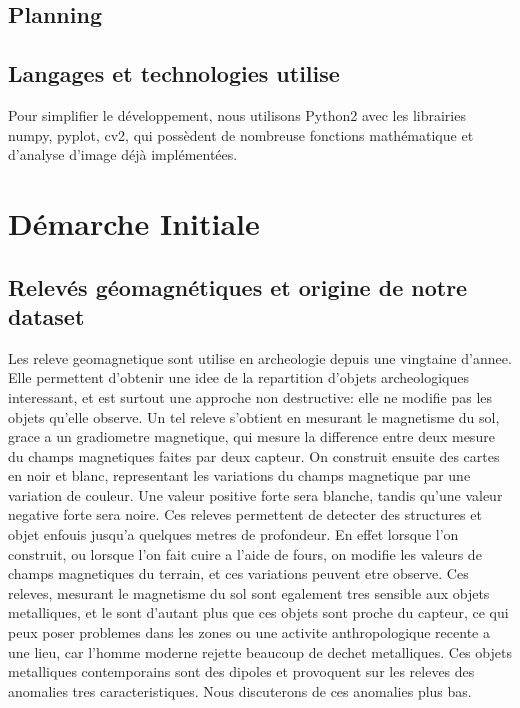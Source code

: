 \documentclass[a4paper, 12pt, titlepage, oneside, french]{article}
\begin{document}
	\subsection{Planning}
	\subsection{Langages et technologies utilise}
	Pour simplifier le développement, nous utilisons Python2 avec les librairies numpy, pyplot, cv2, qui possèdent de nombreuse fonctions mathématique et d'analyse d'image déjà implémentées.
	\newpage

\section{Démarche Initiale}
	
	\subsection{Relevés géomagnétiques et origine de notre dataset}
	Les releve geomagnetique sont utilise en archeologie depuis une vingtaine d'annee. Elle permettent d'obtenir une idee de la repartition d'objets archeologiques interessant, et est surtout une approche non destructive: elle ne modifie pas les objets qu'elle observe. Un tel releve s'obtient en mesurant le magnetisme du sol, grace a un gradiometre magnetique, qui mesure la difference entre deux mesure du champs magnetiques faites par deux capteur. On construit ensuite des cartes en noir et blanc, representant les variations du champs magnetique par une variation de couleur. Une valeur positive forte sera blanche, tandis qu'une valeur negative forte sera noire. Ces releves permettent de detecter des structures et objet enfouis jusqu'a quelques metres de profondeur. En effet lorsque l'on construit, ou lorsque l'on fait cuire a l'aide de fours, on modifie les valeurs de champs magnetiques du terrain, et ces variations peuvent etre observe. Ces releves, mesurant le magnetisme du sol sont egalement tres sensible aux objets metalliques, et le sont d'autant plus que ces objets sont proche du capteur, ce qui peux poser problemes dans les zones ou une activite anthropologique recente a une lieu, car l'homme moderne rejette beaucoup de dechet metalliques. Ces objets metalliques contemporains sont des dipoles et provoquent sur les releves des anomalies tres caracteristiques. Nous discuterons de ces anomalies plus bas.
\end{document}
